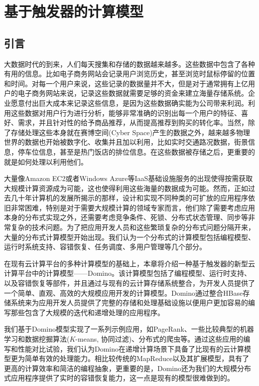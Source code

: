 \chapter{基于触发器的计算模型}
\label{chapter:domino}

\section{引言}

大数据时代的到来，人们每天搜集和存储的数据越来越多。这些数据中包含了各种有用的信息。比如电子商务网站会记录用户浏览历史，甚至浏览时鼠标停留的位置和时间。对每一个用户来说，这些记录的数据量并不大，但是对于通常拥有上亿用户的电子商务网站来说，记录这些数据就需要足够的资金来建立海量存储系统。企业愿意付出巨大成本来记录这些信息，是因为这些数据确实能为公司带来利润。利用这些数据对用户行为进行分析，能够非常准确的识别出每一个用户的特征、喜好、需求，并且针对性的给予商品推荐，从而提高推荐到购买的转化率。当然，除了存储处理这些本身就在赛博空间(Cyber Space)产生的数据之外，越来越多物理世界的数据也开始被数字化、收集并且加以利用，比如实时交通路况数据，街景信息，停车位信息，甚至是热门饭店的排位信息。在这些数据被存储之后，更重要的就是如何处理以利用他们。

大量像Amazon EC2或者Windows Azure等IaaS基础设施服务的出现使得按需获取大规模计算资源成为可能，这也使得利用这些海量的数据成为可能。然而，正如过去几十年计算机的发展所揭示的那样，设计和实现不同种类的可扩放的应用程序依旧非常困难，特别是对于需要大规模计算的领域专家而言，他们除了需要考虑应用本身的分布式实现之外，还需要考虑竞争条件、死锁、分布式状态管理、同步等非常复杂的技术问题。为了把应用开发人员和这些繁琐复杂的分布式问题分隔开来，大量的分布式计算模型开始出现。我们认为一个分布式的计算模型包括编程模型、运行时系统支持、容错恢复、任务调度、多用户管理等几个部分。

在现有云计算平台的多种计算模型的基础上，本章将介绍一种基于触发器的新型云计算平台中的计算模型——Domino。该计算模型包括了编程模型、运行时支持、以及容错恢复等部件，并且通过与现有的云计算存储系统整合，为开发人员提供了一个简单、直观、高效的大规模应用开发的计算模型。Domino通过整合HBase存储系统来为应用开发人员提供了完整的存储和处理基础设施以便用户更加容易的编写那些包含了大规模的迭代和递增处理的应用程序。

我们基于Domino模型实现了一系列示例应用，如PageRank、一些比较典型的机器学习和数据挖掘算法($K$-means, 协同过滤)、分布式的爬虫等。通过这些应用的编写和性能对比试验，我们认为Domino在递增计算场景下具备了比现有的云计算模型更为简单有效的处理能力。相比较传统的MapReduce以及其扩展模型，具有了更高的计算效率和简洁的编程抽象，更重要的是，Domino还为我们的大规模分布式应用程序提供了实时的容错恢复能力，这一点是现有的模型很难做到的。


